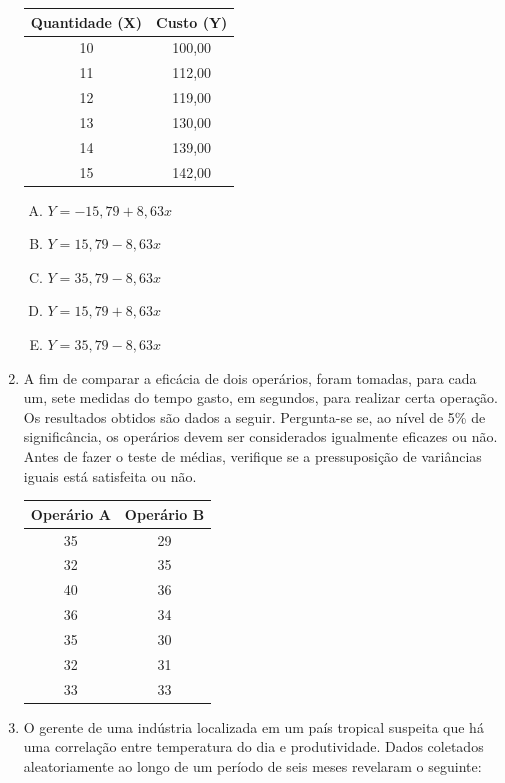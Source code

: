 \documentclass[12pt, a4paper]{article}
\begin{document}
\begin{enumerate}
\begin{center}
\begin{tabular}{|c|c|}
\hline
\textbf{Quantidade (X)} & \textbf{Custo (Y)} \\
\hline
10 & 100,00 \\
11 & 112,00 \\
12 & 119,00 \\
13 & 130,00 \\
14 & 139,00 \\
15 & 142,00 \\
\hline
\end{tabular}
\end{center}

\begin{enumerate}[A)]
    \item $Y=-15,79+8,63x$
    \item $Y=15,79-8,63x$
    \item $Y=35,79-8,63x$
    \item $Y=15,79+8,63x$
    \item $Y=35,79-8,63x$
\end{enumerate}

\item A fim de comparar a eficácia de dois operários, foram tomadas, para cada um, sete medidas do tempo gasto, em segundos, para realizar certa operação. Os resultados obtidos são dados a seguir. Pergunta-se se, ao nível de 5\% de significância, os operários devem ser considerados igualmente eficazes ou não. Antes de fazer o teste de médias, verifique se a pressuposição de variâncias iguais está satisfeita ou não.

\begin{center}
\begin{tabular}{|c|c|}
\hline
\textbf{Operário A} & \textbf{Operário B} \\
\hline
35 & 29 \\
32 & 35 \\
40 & 36 \\
36 & 34 \\
35 & 30 \\
32 & 31 \\
33 & 33 \\
\hline
\end{tabular}
\end{center}

\item O gerente de uma indústria localizada em um país tropical suspeita que há uma correlação entre temperatura do dia e produtividade. Dados coletados aleatoriamente ao longo de um período de seis meses revelaram o seguinte:


\end{enumerate}
\end{document}
